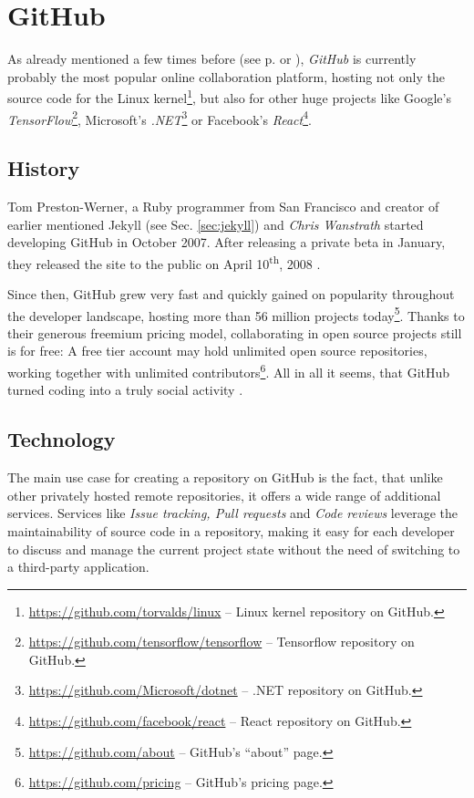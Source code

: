 \section{GitHub}
\label{sec:git-github}

As already mentioned a few times before (see p. \pageref{sec:jekyll} or \pageref{sec:buildpipelines-markdown}), \emph{GitHub} is currently probably the most popular online collaboration platform, hosting not only the source code for the Linux kernel\footnote{\url{https://github.com/torvalds/linux} -- Linux kernel repository on GitHub.}, but also for other huge projects like Google's \emph{TensorFlow}\footnote{\url{https://github.com/tensorflow/tensorflow} -- Tensorflow repository on GitHub.}, Microsoft's \emph{.NET}\footnote{\url{https://github.com/Microsoft/dotnet} -- .NET repository on GitHub.} or Facebook's \emph{React}\footnote{\url{https://github.com/facebook/react} -- React repository on GitHub.}.

\subsection{History}
\label{sec:github-history}
Tom Preston-Werner, a Ruby programmer from San Francisco and creator of earlier mentioned Jekyll (see Sec. \ref{sec:jekyll}) and \emph{Chris Wanstrath} started developing GitHub in October 2007. After releasing a private beta in January, they released the site to the public on April 10\textsuperscript{th}, 2008 \cite{PrestonWerner2008githublaunch}.

Since then, GitHub grew very fast and quickly gained on popularity throughout the developer landscape, hosting more than 56 million projects today\footnote{\url{https://github.com/about} -- GitHub's ``about'' page.}. Thanks to their generous freemium pricing model, collaborating in open source projects still is for free: A free tier account may hold unlimited open source repositories, working together with unlimited contributors\footnote{\url{https://github.com/pricing} -- GitHub's pricing page.}. All in all it seems, that GitHub turned coding into a truly social activity \cite[416]{loeliger2012version}.

\subsection{Technology}
The main use case for creating a repository on GitHub is the fact, that unlike other privately hosted remote repositories, it offers a wide range of additional services. Services like \emph{Issue tracking, Pull requests} and \emph{Code reviews} leverage the maintainability of source code in a repository, making it easy for each developer to discuss and manage the current project state without the need of switching to a third-party application.

